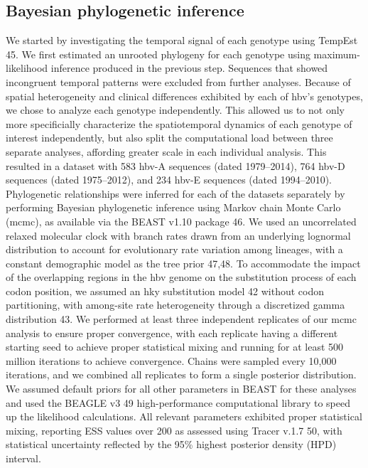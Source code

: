 \subsection{Bayesian phylogenetic inference}
We started by investigating the temporal signal of each genotype using TempEst 45. We first estimated an unrooted phylogeny for each genotype using maximum-likelihood inference produced in the previous step. Sequences that showed incongruent temporal patterns were excluded from further analyses. Because of spatial heterogeneity and clinical differences exhibited by each of \gls{hbv}'s genotypes, we chose to analyze each genotype independently. This allowed us to not only more specificially characterize the spatiotemporal dynamics of each genotype of interest independently, but also split the computational load between three separate analyses, affording greater scale in each individual analysis. This resulted in a dataset with 583 \gls{hbv}-A sequences (dated 1979--2014), 764 \gls{hbv}-D sequences (dated 1975--2012), and 234 \gls{hbv}-E sequences (dated 1994--2010). Phylogenetic relationships were inferred for each of the datasets separately by performing Bayesian phylogenetic inference using Markov chain Monte Carlo (\gls{mcmc}), as available via the BEAST v1.10 package 46. We used an uncorrelated relaxed molecular clock with branch rates drawn from an underlying lognormal distribution to account for evolutionary rate variation among lineages, with a constant demographic model as the tree prior 47,48. To accommodate the impact of the overlapping regions in the \gls{hbv} genome on the substitution process of each codon position, we assumed an \gls{hky} substitution model 42 without codon partitioning, with among-site rate heterogeneity through a discretized gamma distribution 43. We performed at least three independent replicates of our \gls{mcmc} analysis to ensure proper convergence, with each replicate having a different starting seed to achieve proper statistical mixing and running for at least 500 million iterations to achieve convergence. Chains were sampled every 10,000 iterations, and we combined all replicates to form a single posterior distribution. We assumed default priors for all other parameters in BEAST for these analyses and used the BEAGLE v3 49 high-performance computational library to speed up the likelihood calculations. All relevant parameters exhibited proper statistical mixing, reporting ESS values over 200 as assessed using Tracer v.1.7 50, with statistical uncertainty reflected by the 95\% highest posterior density (HPD) interval.\\

